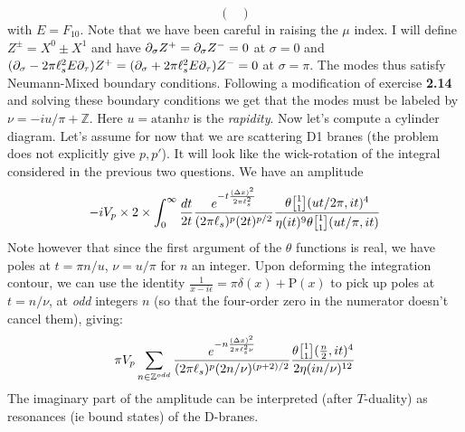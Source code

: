 \documentclass[11pt, class=article, crop=false]{standalone}
\begin{document}
\begin{enumerate}
\[\begin{pmatrix}
		\end{pmatrix}
	\]
	with $E = F_{10}$.
	Note that we have been careful in raising the $\mu$ index. I will define $Z^{\pm} = X^0 \pm X^1$ and have $\partial_\sigma Z^+ = \partial_\sigma Z^- = 0$ at $\sigma = 0$ and $(\partial_\sigma - 2\pi \ell_s^2 E \partial_\tau) Z^+ = (\partial_\sigma +2\pi \ell_s^2 E \partial_\tau) Z^- = 0 $ at  $\sigma = \pi$. The modes thus satisfy Neumann-Mixed boundary conditions. Following a modification of exercise \textbf{2.14} and solving these boundary conditions we get that the modes must be labeled by $\nu = -i u/\pi + \mathbb Z$. Here $u = \mathrm{atanh}{v}$ is the \emph{rapidity}. Now let's compute a cylinder diagram. Let's assume for now that we are scattering D1 branes (the problem does not explicitly give $p, p'$). It will look like the wick-rotation of the integral considered in the previous two questions. We have an amplitude
	\[
		-i V_p \times 2 \times \int_0^\infty \frac{dt}{2t} \frac{e^{-t\frac{(\Delta x)^2}{2\pi \ell_s^2}}}{(2 \pi \ell_s)^p (2 t)^{p/2}} \frac{\theta\twist11 (u t / 2 \pi, it)^4}{\eta(i t)^9 \theta\twist11(u t/\pi, i t)}
	\]
	Note however that since the first argument of the $\theta$ functions is real, we have poles at $t = \pi n / u$, $\nu = u/\pi$ for $n$ an integer. Upon deforming the integration contour, we can use the identity $\frac{1}{x-i\epsilon} = \pi \delta(x) + \mathrm P(x)$ to pick up poles at $t =  n / \nu$, at \emph{odd} integers $n$ (so that the four-order zero in the numerator doesn't cancel them), giving:
	\begin{equation}\label{eq:amplitude}
		\pi V_p  \sum_{n \in \mathbb Z^{odd}} \frac{e^{- n \frac{(\Delta x)^2}{2\pi \ell_s^2 \nu}}}{(2\pi \ell_s)^p (2 n/\nu)^{(p+2)/2}} \frac{\theta \twist11 (\frac{n}{2}, it)^4}{2 \eta(i n/\nu)^{12}}
	\end{equation}
	The imaginary part of the amplitude can be interpreted (after $T$-duality) as resonances (ie bound states) of the D-branes.
	

\end{enumerate}
\end{document}
